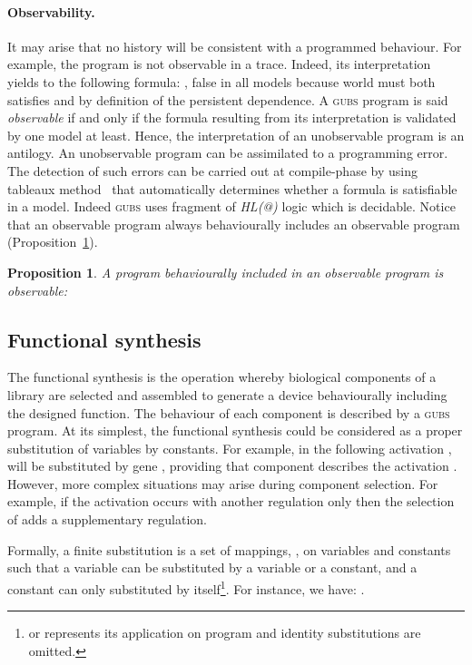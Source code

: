 \documentclass{eptcs}
\newtheorem{proposition}{Proposition}
\newcommand{\ie}[0]{\abbrev{\textit{i.e.}}}
\newcounter{ti}
\begin{document}
\paragraph{Observability.}
\newcommand{\obs}[0]{\textbf{obs}\,}
It may arise that no history will be consistent with a programmed behaviour. For example, the program  is not observable in a trace. Indeed, its interpretation yields to the following formula: , false in all models because world  must both satisfies  and  by definition of the persistent dependence. A \textsc{gubs} program is said \emph{observable} if and only if the formula resulting from its interpretation is validated by one model at least. Hence, the interpretation of an unobservable program is an antilogy. An unobservable program can be assimilated to a programming error. The detection of such errors can be carried out at compile-phase by using tableaux method~\cite{Cerrito2011}
that automatically determines whether a formula is satisfiable in a model. Indeed \textsc{gubs} uses fragment of \textit{HL(@)} logic which is decidable. Notice that an observable program always behaviourally includes an observable program (Proposition~\ref{prop:comp1}).
\begin{proposition} A program behaviourally included in an observable program is observable: 
\label{prop:comp1}

\end{proposition}
\subsection{Functional synthesis}
The functional synthesis is the operation whereby biological components of a library are selected and assembled to generate a device behaviourally including the designed function. The behaviour of each component is described by a \textsc{gubs} program. At its simplest, the functional synthesis could be considered as a proper substitution of variables by constants. For example, in the following activation ,  will be substituted by gene , providing that component  describes the activation . However, more complex situations may arise during component selection. For example, if the activation  occurs with another regulation only \ie  then the selection of  adds a supplementary regulation.

Formally, a finite substitution is a set of mappings, , on variables and constants such that a variable can be substituted by a variable or a constant, and a constant can only substituted by itself\footnote{  or  represents its application on program  and identity substitutions are omitted.}. For instance, we have:
.
\end{document}

